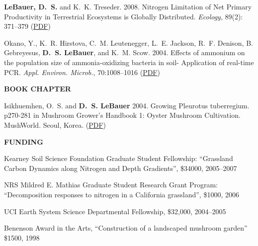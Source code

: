 \documentclass[11pt,twoside]{article}
\begin{document}
\begin{itemize*}
\item \noindent%
\textbf{LeBauer, D.~S.} and K.~K. Treseder. 2008. Nitrogen Limitation of Net Primary Productivity in
Terrestrial Ecosystems is Globally Distributed. \textit{Ecology}, 89(2): 371--379
\ifpdf %
(\href{https://://netfiles.uiuc.edu/dlebauer/www/lebauer2008nln.pdf}{PDF})
\fi %

\item \noindent%
Okano, Y., K.~R. Hirstova, C.~M. Leutenegger, L.~E. Jackson, R.~F. Denison, B. Gebreyesus, \textbf{D.~S.
LeBauer}, and K.~M. Scow. 2004. Effects of ammonium on the population size of ammonia-oxidizing
bacteria in soil- Application of real-time PCR. \textit{Appl. Environ. Microb.}, 70:1008--1016
\ifpdf %
(\href{https://://netfiles.uiuc.edu/dlebauer/www/okano2004art.pdf}{PDF})
\fi %
\end{itemize*}

\textbf{BOOK CHAPTER}
\vspace{-0.5em}
\begin{itemize*}
\item \noindent 
Isikhuemhen, O.~S. and \textbf{D.~S. LeBauer} 2004. Growing Pleurotus tuberregium. p270-281 in Mushroom
Grower's Handbook 1: Oyster Mushroom Cultivation. MushWorld. Seoul, Korea.
\ifpdf %
(\href{https://netfiles.uiuc.edu/dlebauer/www/IsikhuemhenLeBauer2004GrowingPleurotustuberregium.pdf}{PDF}) 
\fi %
\end{itemize*}




\textbf{FUNDING}
\vspace{-0.5em}
\begin{itemize*}
\item Kearney Soil Science Foundation Graduate Student Fellowship:
  ``Grassland Carbon Dynamics along Nitrogen and Depth Gradients'',
  \$34000, 2005--2007 
\item NRS Mildred E. Mathias Graduate Student Research Grant Program:
  ``Decomposition responses to nitrogen in a California grassland'',
  \$1000, 2006 
\item UCI Earth System Science Departmental Fellowship,
\$32,000, 2004--2005
\item Benenson Award in the Arts,
  ``Construction of a landscaped mushroom garden''
\$1500, 1998
\end{itemize*}
\end{document}
